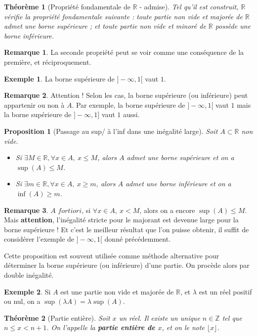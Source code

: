 \documentclass[french]{book}
\newcommand{\Z}{\mathbb{Z}}
\newcommand{\R}{\mathbb{R}}
\theoremstyle{plain}
\newtheorem{thm}{Théorème}[chapter]
\newtheorem{prop}{Proposition}[chapter]
\theoremstyle{definition}
\newtheorem{exa}{Exemple}[chapter]
\newtheorem{rmq}{Remarque}[chapter]
\theoremstyle{remark}
\begin{document}
\begin{thm}[Propriété fondamentale de $\R$ - admise]
	Tel qu'il est construit, $\R$ vérifie la propriété fondamentale suivante : toute partie non vide et majorée de $\R$ admet une borne supérieure ; et toute partie non vide et minoré de $\R$ possède une borne inférieure.
\end{thm}
\begin{rmq}
	La seconde propriété peut se voir comme une conséquence de la première, et réciproquement.
\end{rmq}
\begin{exa}
	La borne supérieure de $]-\infty,1[$ vaut $1$.
\end{exa}
\begin{rmq}
	Attention ! Selon les cas, la borne supérieure (ou inférieure) peut appartenir ou non à $A$. Par exemple, la borne supérieure de $]-\infty,1[$ vaut $1$ mais la borne supérieure de $]-\infty,1]$ vaut $1$ aussi.
\end{rmq}
\begin{prop}[Passage au sup/ à l'inf dans une inégalité large]
	Soit $A\subset\R$ non vide.
	\begin{itemize}
		\item Si $\exists M\in\R, \forall x\in A,\ x\leqslant M$, alors $A$ admet une borne supérieure et on a $\sup(A)\leqslant M$.
		\item Si $\exists m\in\R, \forall x\in A,\ x\geqslant m$, alors $A$ admet une borne inférieure et on a $\inf(A)\geqslant m$.
	\end{itemize}
\end{prop}
\begin{rmq}
	$A$ $fortiori$, si $\forall x\in A,\ x<M$, alors on a encore $\sup(A)\leqslant M$. Mais \textbf{attention}, l'inégalité stricte pour le majorant est devenue large pour la borne supérieure ! Et c'est le meilleur résultat que l'on puisse obtenir, il suffit de considérer l'exemple de $]-\infty,1[$ donné précédemment.
\end{rmq}
Cette proposition est souvent  utilisée comme méthode alternative pour déterminer la borne supérieure (ou inférieure) d'une partie. On procède alors par double inégalité.
\begin{exa}
	Si $A$ est une partie non vide et majorée de $\R$, et $\lambda$ est un réel positif ou nul, on a $\sup(\lambda A)=\lambda\sup(A)$.
\end{exa}
\begin{thm}[Partie entière]
	Soit $x$ un réel. Il existe un unique $n\in\Z$ tel que $n\leqslant x< n+1$. On l'appelle la \textbf{partie entière de $x$}, et on le note $\lfloor x\rfloor$.
\end{thm}
\end{document}
